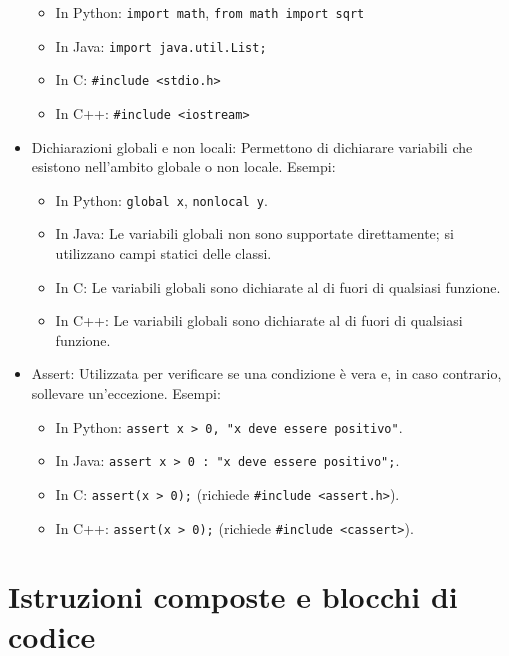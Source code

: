 \documentclass[
  letterpaper,
]{scrbook}
\providecommand{\tightlist}{%
  \setlength{\itemsep}{0pt}\setlength{\parskip}{0pt}}\usepackage{longtable,booktabs,array}
\begin{document}
\begin{itemize}
  \begin{itemize}
  \tightlist
  \item
    In Python: \texttt{import\ math}, \texttt{from\ math\ import\ sqrt}
  \item
    In Java: \texttt{import\ java.util.List;}
  \item
    In C: \texttt{\#include\ \textless{}stdio.h\textgreater{}}
  \item
    In C++: \texttt{\#include\ \textless{}iostream\textgreater{}}
  \end{itemize}
\item
  Dichiarazioni globali e non locali: Permettono di dichiarare variabili
  che esistono nell'ambito globale o non locale. Esempi:

  \begin{itemize}
  \tightlist
  \item
    In Python: \texttt{global\ x}, \texttt{nonlocal\ y}.
  \item
    In Java: Le variabili globali non sono supportate direttamente; si
    utilizzano campi statici delle classi.
  \item
    In C: Le variabili globali sono dichiarate al di fuori di qualsiasi
    funzione.
  \item
    In C++: Le variabili globali sono dichiarate al di fuori di
    qualsiasi funzione.
  \end{itemize}
\item
  Assert: Utilizzata per verificare se una condizione è vera e, in caso
  contrario, sollevare un'eccezione. Esempi:

  \begin{itemize}
  \tightlist
  \item
    In Python:
    \texttt{assert\ x\ \textgreater{}\ 0,\ "x\ deve\ essere\ positivo"}.
  \item
    In Java:
    \texttt{assert\ x\ \textgreater{}\ 0\ :\ "x\ deve\ essere\ positivo";}.
  \item
    In C: \texttt{assert(x\ \textgreater{}\ 0);} (richiede
    \texttt{\#include\ \textless{}assert.h\textgreater{}}).
  \item
    In C++: \texttt{assert(x\ \textgreater{}\ 0);} (richiede
    \texttt{\#include\ \textless{}cassert\textgreater{}}).
  \end{itemize}
\end{itemize}

\section{Istruzioni composte e blocchi di
codice}\label{istruzioni-composte-e-blocchi-di-codice}
\end{document}
